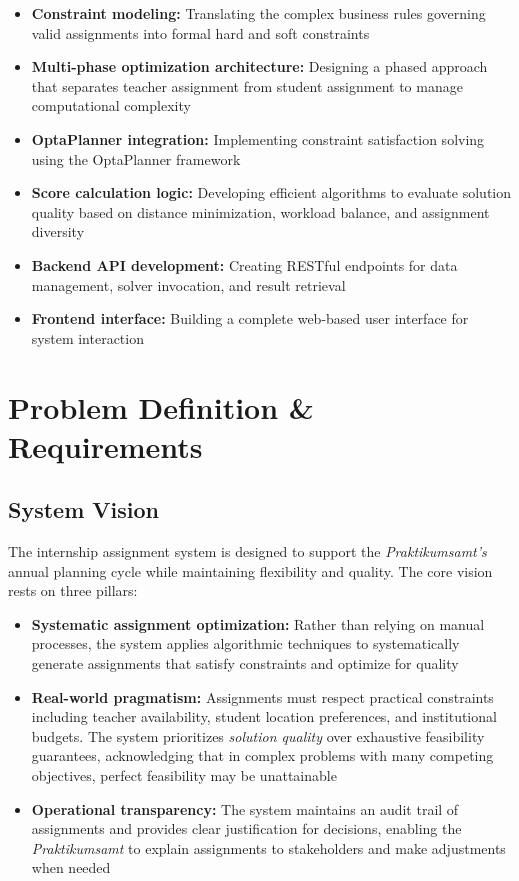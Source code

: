 \documentclass[12pt,a4paper]{report}
\begin{document}
\begin{itemize}
    \item \textbf{Constraint modeling:} Translating the complex business rules governing valid assignments into formal hard and soft constraints
    \item \textbf{Multi-phase optimization architecture:} Designing a phased approach that separates teacher assignment from student assignment to manage computational complexity
    \item \textbf{OptaPlanner integration:} Implementing constraint satisfaction solving using the OptaPlanner framework
    \item \textbf{Score calculation logic:} Developing efficient algorithms to evaluate solution quality based on distance minimization, workload balance, and assignment diversity
    \item \textbf{Backend API development:} Creating RESTful endpoints for data management, solver invocation, and result retrieval
    \item \textbf{Frontend interface:} Building a complete web-based user interface for system interaction
\end{itemize}


\chapter{Problem Definition \& Requirements}

\section{System Vision}

The internship assignment system is designed to support the \textit{Praktikumsamt's} annual planning cycle while maintaining flexibility and quality. The core vision rests on three pillars:

\begin{itemize}
    \item \textbf{Systematic assignment optimization:} Rather than relying on manual processes, the system applies algorithmic techniques to systematically generate assignments that satisfy constraints and optimize for quality
    \item \textbf{Real-world pragmatism:} Assignments must respect practical constraints including teacher availability, student location preferences, and institutional budgets. The system prioritizes \textit{solution quality} over exhaustive feasibility guarantees, acknowledging that in complex problems with many competing objectives, perfect feasibility may be unattainable
    \item \textbf{Operational transparency:} The system maintains an audit trail of assignments and provides clear justification for decisions, enabling the \textit{Praktikumsamt} to explain assignments to stakeholders and make adjustments when needed
\end{itemize}
\end{document}
